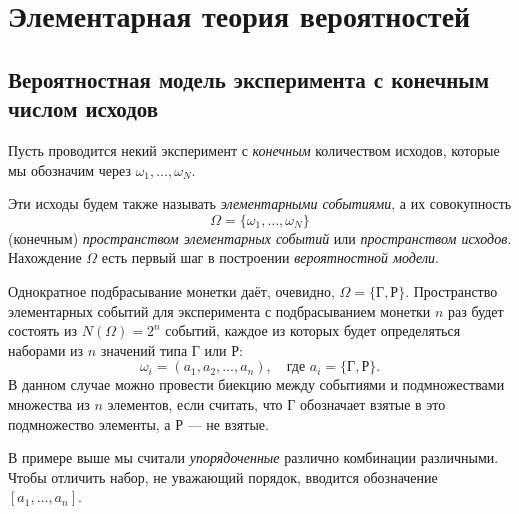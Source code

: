 \chapter{Элементарная теория вероятностей}
\section{Вероятностная модель эксперимента с конечным числом исходов}
Пусть проводится некий эксперимент с \emph{конечным} количеством исходов,
которые мы обозначим через $ \omega_1, \dots, \omega_N $.

Эти исходы будем также называть \emph{элементарными событиями}, а их
совокупность  
\[
	\Omega = \{ \omega_1, \dots , \omega_N\}
\]
(конечным) \emph{пространством элементарных событий} или \emph{пространством
исходов}.
Нахождение $ \Omega $ есть первый шаг в построении \emph{вероятностной модели}.
\begin{example} 
	Однократное подбрасывание монетки даёт, очевидно, $ \Omega = \{\text{Г}, \text{Р}\} $.
	Пространство элементарных событий для эксперимента с подбрасыванием монетки
	$n$ раз будет состоять из $ N(\Omega) = 2^n$ событий, каждое из которых будет определяться
наборами из $n$ значений типа Г или Р:
\[
	\omega_i = (a_1, a_2, \dots , a_n), \quad \text{где } a_i = \{ \text{Г},
	\text{Р} \}.
\]
В данном случае можно провести биекцию между событиями и подмножествами множества из $ n $
элементов, если считать, что Г обозначает взятые в это подмножество элементы, а
Р --- не взятые.
\end{example}

В примере выше мы считали \emph{упорядоченные} различно комбинации различными.
Чтобы отличить набор, не уважающий порядок, вводится обозначение $
[a_1,\ldots,a_n] $.

